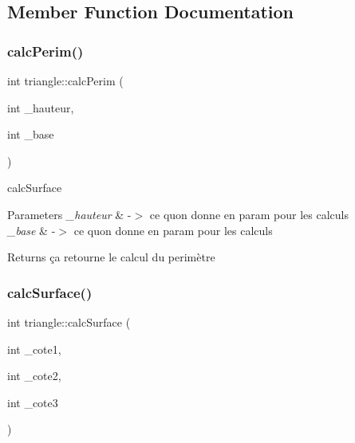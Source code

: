 \subsection{Member Function Documentation}
\mbox{\label{classtriangle_add93fe57e11592724508a1236b1178bf}} 
\subsubsection{\texorpdfstring{calc\+Perim()}{calcPerim()}}
{\footnotesize\ttfamily int triangle\+::calc\+Perim (\begin{DoxyParamCaption}\item[{int}]{\+\_\+hauteur,  }\item[{int}]{\+\_\+base }\end{DoxyParamCaption})}



calc\+Surface 


\begin{DoxyParams}{Parameters}
{\em \+\_\+hauteur} & -\/$>$ ce qu\textquotesingle{}on donne en param pour les calculs \\
\hline
{\em \+\_\+base} & -\/$>$ ce qu\textquotesingle{}on donne en param pour les calculs \\
\hline
\end{DoxyParams}
\begin{DoxyReturn}{Returns}
ça retourne le calcul du perimètre 
\end{DoxyReturn}
\mbox{\label{classtriangle_ac5fc18c9689b3cf055b431cfd189fe3b}} 
\subsubsection{\texorpdfstring{calc\+Surface()}{calcSurface()}}
{\footnotesize\ttfamily int triangle\+::calc\+Surface (\begin{DoxyParamCaption}\item[{int}]{\+\_\+cote1,  }\item[{int}]{\+\_\+cote2,  }\item[{int}]{\+\_\+cote3 }\end{DoxyParamCaption})}



